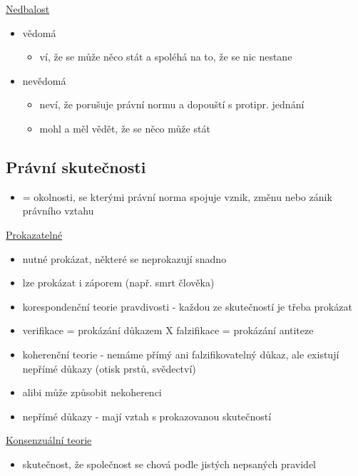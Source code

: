 \underline{Nedbalost}
\begin{itemize}
    \item vědomá
    \begin{itemize}
        \item ví, že se může něco stát a spoléhá na to, že se nic nestane
    \end{itemize}
    \item nevědomá
    \begin{itemize}
        \item neví, že porušuje právní normu a dopouští s protipr. jednání
        \item mohl a měl vědět, že se něco může stát
    \end{itemize}
\end{itemize}

\subsection*{Právní skutečnosti}
\begin{itemize}
    \item = okolnosti, se kterými právní norma spojuje vznik, změnu nebo zánik právního vztahu \\
\end{itemize}

\underline{Prokazatelné}
\begin{itemize}
    \item nutné prokázat, některé se neprokazují snadno
    \item lze prokázat i záporem (např. smrt člověka)
    \item korespondenční teorie pravdivosti - každou ze skutečností je třeba prokázat
    \item verifikace = prokázání důkazem X falzifikace = prokázání antiteze
    \item koherenční teorie - nemáme přímý ani falzifikovatelný důkaz, ale existují nepřímé důkazy (otisk prstů, svědectví)
    \item alibi může způsobit nekoherenci
    \item nepřímé důkazy - mají vztah s prokazovanou skutečností \\
\end{itemize}

\underline{Konsenzuální teorie}
\begin{itemize}
    \item skutečnost, že společnost se chová podle jistých nepsaných pravidel \\
\end{itemize}

